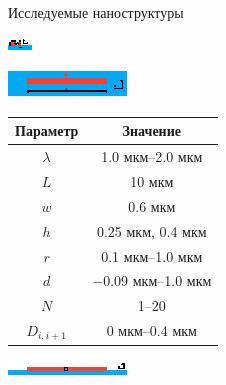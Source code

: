 \begin{frame}{Исследуемые наноструктуры}
	\begin{minipage}[b]{.5\textwidth}
		\includegraphics[width=.95\textwidth]{img/scheme_yz3}
		
		\includegraphics[width=.9\textwidth]{img/scheme_xy3}
		\vspace{3em}
	\end{minipage}%
	\begin{minipage}[b]{.5\textwidth}
		\begin{table}
			\begin{tabular}{|c|c|}
				\hline
				Параметр & Значение\\
				\hline
				\hline
				$\lambda$ & 1.0 мкм--2.0 мкм \\
				\hline
				$L$ & 10 мкм \\
				\hline
				$w$ & 0.6 мкм \\
				\hline
				$h$ & 0.25 мкм, 0.4 мкм \\
				\hline
				$r$ & 0.1 мкм--1.0 мкм\\
				\hline
				$d$ & $-$0.09 мкм--1.0 мкм\\
				\hline
				$N$ & 1--20 \\
				\hline
				$D_{i, i+1}$ & 0 мкм--0.4 мкм \\
				\hline
			\end{tabular}
		\end{table}
	\end{minipage}
	
	\includegraphics[width=\textwidth]{img/scheme_xz}
\end{frame}